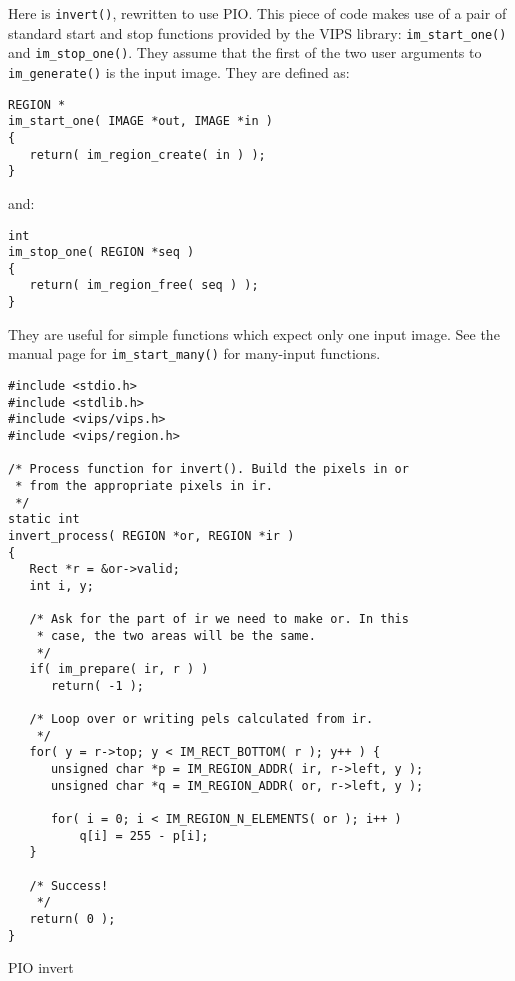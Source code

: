 Here is \verb+invert()+, rewritten to use PIO. This piece of code makes use
of a pair of standard start and stop functions provided by the VIPS library:
\verb+im_start_one()+ and \verb+im_stop_one()+. They assume that the first
of the two user arguments to \verb+im_generate()+ is the input image. They are
defined as:

\begin{verbatim}
REGION *
im_start_one( IMAGE *out, IMAGE *in )
{
   return( im_region_create( in ) );
} 
\end{verbatim}

\noindent
and:

\begin{verbatim}
int
im_stop_one( REGION *seq )
{
   return( im_region_free( seq ) );
} 
\end{verbatim}

They are useful for simple functions which expect only one input
image. See the manual page for \verb+im_start_many()+ for many-input 
functions.

\begin{fig2}
\begin{verbatim}
#include <stdio.h>
#include <stdlib.h>
#include <vips/vips.h>
#include <vips/region.h>

/* Process function for invert(). Build the pixels in or 
 * from the appropriate pixels in ir.
 */
static int
invert_process( REGION *or, REGION *ir )
{
   Rect *r = &or->valid;
   int i, y;

   /* Ask for the part of ir we need to make or. In this 
    * case, the two areas will be the same.
    */
   if( im_prepare( ir, r ) )
      return( -1 );
   
   /* Loop over or writing pels calculated from ir.
    */
   for( y = r->top; y < IM_RECT_BOTTOM( r ); y++ ) {
      unsigned char *p = IM_REGION_ADDR( ir, r->left, y );
      unsigned char *q = IM_REGION_ADDR( or, r->left, y );

      for( i = 0; i < IM_REGION_N_ELEMENTS( or ); i++ )
          q[i] = 255 - p[i];
   }

   /* Success!
    */
   return( 0 );
}
\end{verbatim}
\caption{PIO invert}
\label{fg:p2invert}
\end{fig2}

